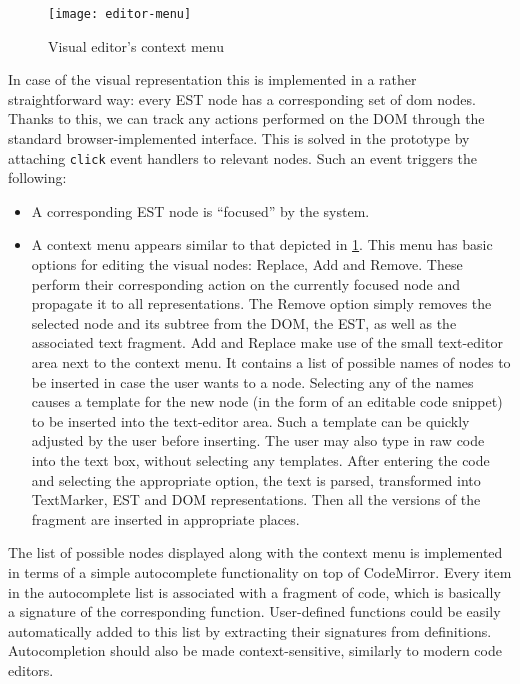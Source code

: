 \begin{figure}[h!]
\centering \texttt{[image: editor-menu]}
\caption{Visual editor's context menu}
\label{fig:editor-menu}
\end{figure}

In case of the visual representation this is implemented in a rather
straightforward way: every EST node has a corresponding set of \acrshort{dom}
nodes. Thanks to this, we can track any actions performed on the DOM through the
standard browser-implemented interface. This is solved in the prototype by
attaching \texttt{click} event handlers to relevant nodes. Such an event
triggers the following:
\begin{itemize}
    \item A corresponding EST node is ``focused'' by the system.
    \item A context menu appears similar to that depicted in
      \ref{fig:editor-menu}. This menu has basic options for editing the visual
      nodes: Replace, Add and Remove. These perform their corresponding action
      on the currently focused node and propagate it to all representations. The
      Remove option simply removes the selected node and its subtree from the
      DOM, the EST, as well as the associated text fragment. Add and Replace
      make use of the small text-editor area next to the context menu. It
      contains a list of possible names of nodes to be inserted in case the user
      wants to a node. Selecting any of the names causes a template for the new
      node (in the form of an editable code snippet) to be inserted into the
      text-editor area. Such a template can be quickly adjusted by the user
      before inserting. The user may also type in raw code into the text box,
      without selecting any templates. After entering the code and selecting the
      appropriate option, the text is parsed, transformed into TextMarker, EST
      and DOM representations. Then all the versions of the fragment are
      inserted in appropriate places.
\end{itemize}

The list of possible nodes displayed along with the context menu is implemented
in terms of a simple autocomplete functionality on top of CodeMirror. Every item
in the autocomplete list is associated with a fragment of code, which is
basically a signature of the corresponding function. User-defined functions
could be easily automatically added to this list by extracting their signatures
from definitions. Autocompletion should also be made context-sensitive,
similarly to modern code editors.

